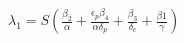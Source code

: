 \documentclass[preview]{standalone}
\begin{document}
\begin{center}
$\lambda_1 = S ( \frac{\beta_2}{\alpha} + \frac{\epsilon_p \beta_4}{\alpha \delta_p} + \frac{\beta_3}{\delta_c} + \frac{\beta1}{\gamma} )$
\end{center}
\end{document}
